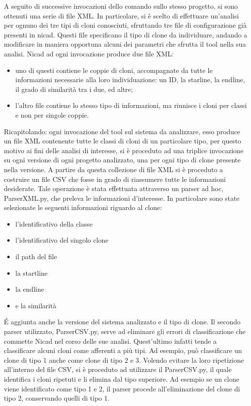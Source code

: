 A seguito di successive invocazioni dello comando sullo stesso progetto, si sono ottenuti una serie di file XML. In particolare, si è scelto di effettuare un'analisi per ognuno dei tre tipi di cloni conosciuti, sfruttando tre file di configurazione già presenti in nicad. Questi file specificano il tipo di clone da individuare, andando a modificare in maniera opportuna alcuni dei parametri che sfrutta il tool nella sua analisi. Nicad ad ogni invocazione produce due file XML:
\begin{itemize}
	\item uno di questi contiene le coppie di cloni, accompagnate da tutte le informazioni necessarie alla loro individuazione: un ID, la starline, la endline, il grado di similarità tra i due, ed altre;
	\item l'altro file contiene lo stesso tipo di informazioni, ma riunisce i cloni per classi e non per singole coppie.
\end{itemize}
Ricapitolando: ogni invocazione del tool sul sistema da analizzare, esso produce un file XML contenente tutte le classi di cloni di un particolare tipo, per questo motivo ai fini delle analisi di interesse, si è proceduto ad una triplice invocazione su ogni versione di ogni progetto analizzato, una per ogni tipo di clone presente nella versione.
A partire da questa collezione di file XML si è proceduto a costruire un file CSV che fosse in grado di riassumere tutte le informazioni desiderate. Tale operazione è stata effettuata attraverso un parser ad hoc, ParserXML.py, che preleva le informazioni d'interesse. In particolare sono state selezionate le seguenti informazioni riguardo al clone:
\begin{itemize}
\item l'identificativo della classe
\item l'identificativo del singolo clone
\item il path del file
\item la startline
\item la endline
\item e la similarità
\end{itemize} 
\'E aggiunta anche la versione del sistema analizzato e il tipo di clone. 
Il secondo parser utilizzato, ParserCSV.py, serve ad eliminare gli errori di classificazione che commette Nicad nel corso delle sue analisi. Quest'ultimo infatti tende a classificare alcuni cloni come afferenti a più tipi. Ad esempio, può classificare un clone di tipo 1 anche come clone di tipo 2 e 3. Volendo evitare la loro ripetizione all'interno del file CSV, si è proceduto ad utilizzare il ParserCSV.py, il quale identifica i cloni ripetuti e li elimina dal tipo superiore. Ad esempio se un clone viene identificato come tipo 1 e 2, il parser procede all'eliminazione del clone di tipo 2, conservando quelli di tipo 1.